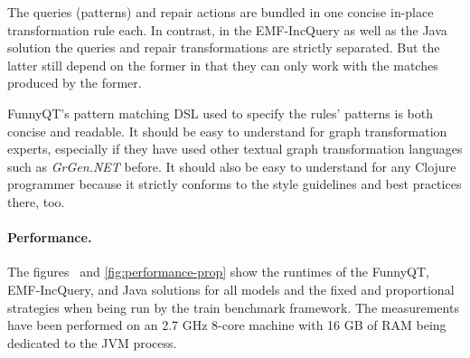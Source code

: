 \documentclass[submission]{eptcs}
\begin{document}
\begin{compactitem}
\item The queries (patterns) and repair actions are bundled in one concise
  in-place transformation rule each.  In contrast, in the EMF-IncQuery as well
  as the Java solution the queries and repair transformations are strictly
  separated.  But the latter still depend on the former in that they can only
  work with the matches produced by the former.
\item FunnyQT's pattern matching DSL used to specify the rules' patterns is
  both concise and readable.  It should be easy to understand for graph
  transformation experts, especially if they have used other textual graph
  transformation languages such as \emph{GrGen.NET} before.  It should also be
  easy to understand for any Clojure programmer because it strictly conforms to
  the style guidelines and best practices there, too.
\end{compactitem}

\paragraph{Performance.}

The figures~ and \vref{fig:performance-prop} show
the runtimes of the FunnyQT, EMF-IncQuery, and Java solutions for all models
and the fixed and proportional strategies when being run by the train benchmark
framework.  The measurements have been performed on an 2.7 GHz 8-core machine
with 16 GB of RAM being dedicated to the JVM process.
\end{document}
